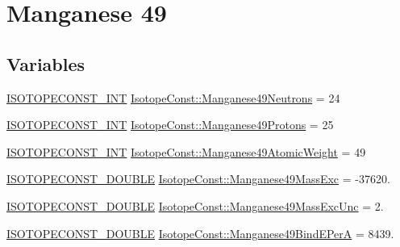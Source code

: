 \hypertarget{group___isotope_const-_manganese-_mn49}{}\section{Manganese 49}
\label{group___isotope_const-_manganese-_mn49}
\subsection*{Variables}
\begin{DoxyCompactItemize}
\item 
\mbox{\hyperlink{group___isotope_const-_macros_ga5f18360b3e99483a35c32d789e62621c}{I\+S\+O\+T\+O\+P\+E\+C\+O\+N\+S\+T\+\_\+\+I\+NT}} \mbox{\hyperlink{group___isotope_const-_manganese-_mn49_gae95593dc1215ee8626fca39ef8c7430b}{Isotope\+Const\+::\+Manganese49\+Neutrons}} = 24
\item 
\mbox{\hyperlink{group___isotope_const-_macros_ga5f18360b3e99483a35c32d789e62621c}{I\+S\+O\+T\+O\+P\+E\+C\+O\+N\+S\+T\+\_\+\+I\+NT}} \mbox{\hyperlink{group___isotope_const-_manganese-_mn49_gaf89ebc6128b98cc75eab60aebaf1a8c8}{Isotope\+Const\+::\+Manganese49\+Protons}} = 25
\item 
\mbox{\hyperlink{group___isotope_const-_macros_ga5f18360b3e99483a35c32d789e62621c}{I\+S\+O\+T\+O\+P\+E\+C\+O\+N\+S\+T\+\_\+\+I\+NT}} \mbox{\hyperlink{group___isotope_const-_manganese-_mn49_gad014523ac91f0cd53a116fd07454a696}{Isotope\+Const\+::\+Manganese49\+Atomic\+Weight}} = 49
\item 
\mbox{\hyperlink{group___isotope_const-_macros_ga8f45a7272ce02c0b4c65c44636ed719a}{I\+S\+O\+T\+O\+P\+E\+C\+O\+N\+S\+T\+\_\+\+D\+O\+U\+B\+LE}} \mbox{\hyperlink{group___isotope_const-_manganese-_mn49_ga9562a4cb8c0b09f334e323b6001e5792}{Isotope\+Const\+::\+Manganese49\+Mass\+Exc}} = -\/37620.
\item 
\mbox{\hyperlink{group___isotope_const-_macros_ga8f45a7272ce02c0b4c65c44636ed719a}{I\+S\+O\+T\+O\+P\+E\+C\+O\+N\+S\+T\+\_\+\+D\+O\+U\+B\+LE}} \mbox{\hyperlink{group___isotope_const-_manganese-_mn49_ga8c125769793526ee523006c2f244ee6a}{Isotope\+Const\+::\+Manganese49\+Mass\+Exc\+Unc}} = 2.
\item 
\mbox{\hyperlink{group___isotope_const-_macros_ga8f45a7272ce02c0b4c65c44636ed719a}{I\+S\+O\+T\+O\+P\+E\+C\+O\+N\+S\+T\+\_\+\+D\+O\+U\+B\+LE}} \mbox{\hyperlink{group___isotope_const-_manganese-_mn49_ga0446b83875eff684747414cc15b5f6ed}{Isotope\+Const\+::\+Manganese49\+Bind\+E\+PerA}} = 8439.
\item 

\end{DoxyCompactItemize}

